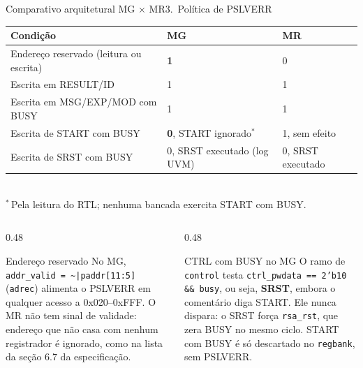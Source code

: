\documentclass[aspectratio=169,10pt,t]{beamer}
\begin{document}
\begin{frame}{Comparativo arquitetural MG × MR}{3.~Política de PSLVERR}
  \vspace*{-0.2cm}
  \begin{center}
    \footnotesize
    \begin{tabular}{@{}lll@{}}
      \toprule
      \textbf{Condição} & \textbf{MG} & \textbf{MR} \\
      \midrule
      Endereço reservado (leitura ou escrita) & \alert{\textbf{1}} & 0 \\
      Escrita em RESULT/ID & 1 & 1 \\
      Escrita em MSG/EXP/MOD com BUSY & 1 & 1 \\
      Escrita de START com BUSY & \alert{\textbf{0}}, START ignorado$^{*}$ & 1, sem efeito \\
      Escrita de SRST com BUSY & 0, SRST executado (log UVM) & 0, SRST executado \\
      \bottomrule
    \end{tabular}\\[0.05cm]
    {\tiny $^{*}$\,Pela leitura do RTL; nenhuma bancada exercita START com BUSY.}
  \end{center}
  \vspace{0.05cm}
  \begin{columns}[T]
    \begin{column}{0.48\textwidth}
      \begin{block}{Endereço reservado}
        \scriptsize No MG, \texttt{addr\_valid = \textasciitilde|paddr[11:5]} (\texttt{adrec}) alimenta o PSLVERR em qualquer acesso a 0x020–0xFFF. O MR não tem sinal de validade: endereço que não casa com nenhum registrador é ignorado, como na lista da seção 6.7 da especificação.
      \end{block}
    \end{column}
    \begin{column}{0.48\textwidth}
      \begin{alertblock}{CTRL com BUSY no MG}
        \scriptsize O ramo de \texttt{control} testa \texttt{ctrl\_pwdata == 2'b10 \&\& busy}, ou seja, \textbf{SRST}, embora o comentário diga START. Ele nunca dispara: o SRST força \texttt{rsa\_rst}, que zera BUSY no mesmo ciclo. START com BUSY é só descartado no \texttt{regbank}, sem PSLVERR.
      \end{alertblock}
    \end{column}
  \end{columns}
\end{frame}
\end{document}
